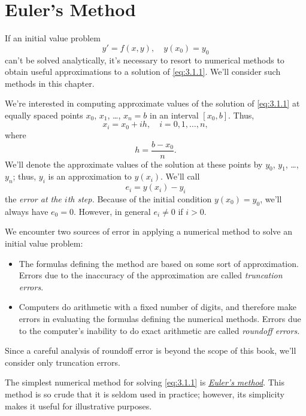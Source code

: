 \section{Euler's Method}

\noindent
If an initial value problem
\begin{equation}
  \label{eq:3.1.1}y'=f(x,y),\quad y(x_{0})=y_{0}
\end{equation}
can't be solved analytically, it's necessary to resort to numerical methods to obtain useful
approximations to a solution of \eqref{eq:3.1.1}. We'll consider such methods in this chapter.

We're interested in computing approximate values of the solution of \eqref{eq:3.1.1} at equally
spaced points $x_{0}$, $x_{1}$, \dots, $x_{n}=b$ in an interval $[x_{0},b]$. Thus,
\[
  x_{i}=x_{0}+ih,\quad i=0,1,\dots,n,
\]
where
\[
  h=\frac{b-x_{0}}{n}.
\]
We'll denote the approximate values of the solution at these points by $y_{0}$, $y_{1}$, \dots,
$y_{n}$; thus, $y_{i}$ is an approximation to $y(x_{i})$. We'll call
\[
  e_{i}=y(x_{i})-y_{i}
\]
the {\color{blue}\it error at the $i$th step.\/} Because of the initial condition $y(x_{0})=y_{0}$,
we'll always have $e_{0}=0$. However, in general $e_{i}\ne0$ if $i>0$.

We encounter two sources of error in applying a numerical method to solve an initial value problem:
\begin{itemize}
  \item The formulas defining the method are based on some sort of approximation. Errors due to the
        inaccuracy of the approximation are called {\color{blue}\it truncation errors\/}.

  \item Computers do arithmetic with a fixed number of digits, and therefore make errors in
        evaluating the formulas defining the numerical methods. Errors due to the computer's
        inability to do exact arithmetic are called {\color{blue}\it roundoff errors.\/}
\end{itemize}

Since a careful analysis of roundoff error is beyond the scope of this book, we'll consider only
truncation errors.


\noindent
The simplest numerical method for solving \eqref{eq:3.1.1} is
\href{https://mathshistory.st-andrews.ac.uk/Biographies/Euler/}{\color{blue}
\it Euler's method\/}. This method is so crude that it is seldom used in practice; however, its
simplicity makes it useful for illustrative purposes.

